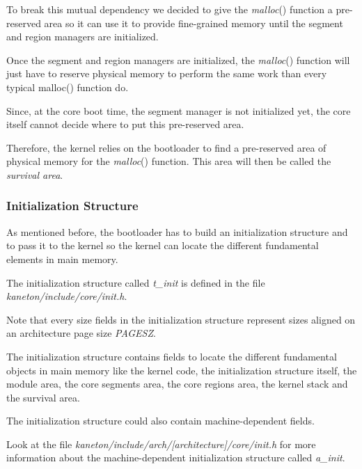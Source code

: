 To break this mutual dependency we decided to give the \textit{malloc}()
function a pre-reserved area so it can use it to provide fine-grained
memory until the segment and region managers are initialized.

Once the segment and region managers are initialized, the
\textit{malloc}() function will just have to reserve physical memory to
perform the same work than every typical malloc() function do.

Since, at the core boot time, the segment manager is not initialized yet,
the core itself cannot decide where to put this pre-reserved area.

Therefore, the kernel relies on the bootloader to find a pre-reserved
area of physical memory for the \textit{malloc}() function. This area will
then be called the \textit{survival area}.

%
%

\subsubsection{Initialization Structure}

As mentioned before, the bootloader has to build an initialization structure
and to pass it to the kernel so the kernel can locate the different
fundamental elements in main memory.

The initialization structure called \textit{t\_init} is defined in the
file \textit{kaneton/include/core/init.h}.

Note that every size fields in the initialization structure represent
sizes aligned on an architecture page size \textit{PAGESZ}.

The initialization structure contains fields to locate the different
fundamental objects in main memory like the kernel code,
the initialization structure itself, the module area, the core segments
area, the core regions area, the kernel stack and the survival
area.

The initialization structure could also contain machine-dependent fields.

Look at the file \textit{kaneton/include/arch/[architecture]/core/init.h}
for more information about the machine-dependent initialization structure
called \textit{a\_init}.

